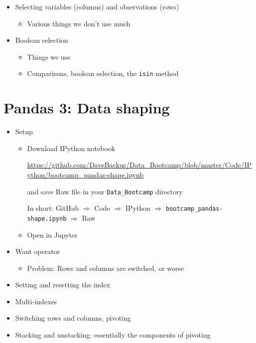 \documentclass[11pt]{article}
\begin{document}
\begin{itemize}
\item Selecting variables (columns) and observations (rows)
\begin{itemize}
\item Various things we don't use much
\end{itemize}

\item Boolean selection
\begin{itemize}
\item Things we use
\item Comparisons, boolean selection, the {\tt isin} method
\end{itemize}



\end{itemize}


\section*{Pandas 3:  Data shaping}

\begin{itemize}
\item Setup
\begin{itemize}
\item Download IPython notebook

\url{https://github.com/DaveBackus/Data_Bootcamp/blob/master/Code/IPython/bootcamp_pandas-shape.ipynb}

and save Raw file in your \verb|Data_Bootcamp| directory

In short:  GitHub $\Rightarrow$ Code $\Rightarrow$ IPython $\Rightarrow$
 \verb|bootcamp_pandas-shape.ipynb| $\Rightarrow$ Raw

\item Open in Jupyter
\end{itemize}

\item Want operator
\begin{itemize}
\item Problem:  Rows and columns are switched, or worse
\end{itemize}

\item Setting and resetting the index
\item Multi-indexes
\item Switching rows and columns, pivoting
\item Stacking and unstacking:  essentially the components of pivoting
\end{itemize}
\end{document}
